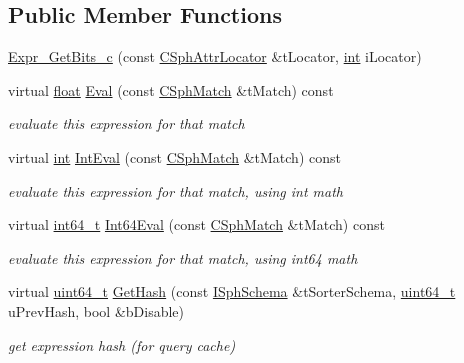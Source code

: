 \subsection*{Public Member Functions}
\begin{DoxyCompactItemize}
\item 
\hyperlink{structExpr__GetBits__c_a8e674941b27a423e0e001210eaa751ab}{Expr\-\_\-\-Get\-Bits\-\_\-c} (const \hyperlink{structCSphAttrLocator}{C\-Sph\-Attr\-Locator} \&t\-Locator, \hyperlink{sphinxexpr_8cpp_a4a26e8f9cb8b736e0c4cbf4d16de985e}{int} i\-Locator)
\item 
virtual \hyperlink{sphinxexpr_8cpp_a0e0d0739f7035f18f949c2db2c6759ec}{float} \hyperlink{structExpr__GetBits__c_abcd16ae2cfb2b240eba2601ac2331b64}{Eval} (const \hyperlink{classCSphMatch}{C\-Sph\-Match} \&t\-Match) const 
\begin{DoxyCompactList}\small\item\em evaluate this expression for that match \end{DoxyCompactList}\item 
virtual \hyperlink{sphinxexpr_8cpp_a4a26e8f9cb8b736e0c4cbf4d16de985e}{int} \hyperlink{structExpr__GetBits__c_a24ccb6ae73a197a81304a34d1b475b1d}{Int\-Eval} (const \hyperlink{classCSphMatch}{C\-Sph\-Match} \&t\-Match) const 
\begin{DoxyCompactList}\small\item\em evaluate this expression for that match, using int math \end{DoxyCompactList}\item 
virtual \hyperlink{sphinxstd_8h_a996e72f71b11a5bb8b3b7b6936b1516d}{int64\-\_\-t} \hyperlink{structExpr__GetBits__c_a47b05538e8ba4d9bb53c501e8ffe92b4}{Int64\-Eval} (const \hyperlink{classCSphMatch}{C\-Sph\-Match} \&t\-Match) const 
\begin{DoxyCompactList}\small\item\em evaluate this expression for that match, using int64 math \end{DoxyCompactList}\item 
virtual \hyperlink{sphinxstd_8h_aaa5d1cd013383c889537491c3cfd9aad}{uint64\-\_\-t} \hyperlink{structExpr__GetBits__c_a6517256cb47b0088370bf8d6c8b69001}{Get\-Hash} (const \hyperlink{classISphSchema}{I\-Sph\-Schema} \&t\-Sorter\-Schema, \hyperlink{sphinxstd_8h_aaa5d1cd013383c889537491c3cfd9aad}{uint64\-\_\-t} u\-Prev\-Hash, bool \&b\-Disable)
\begin{DoxyCompactList}\small\item\em get expression hash (for query cache) \end{DoxyCompactList}\end{DoxyCompactItemize}
